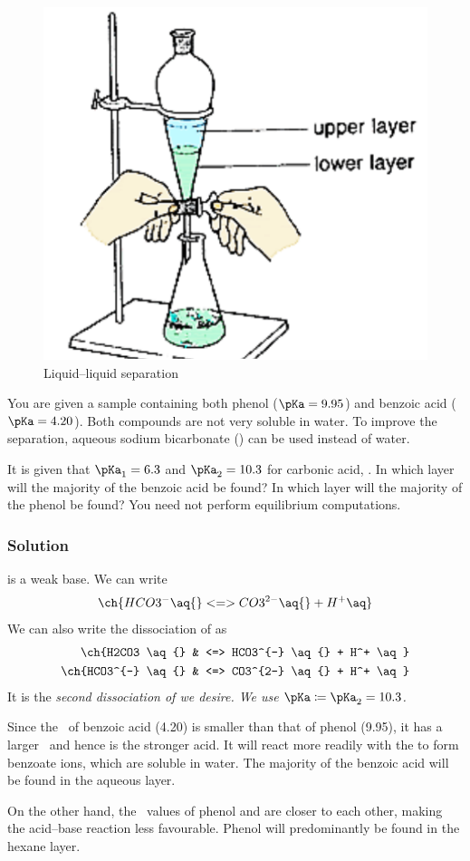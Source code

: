 \begin{figure}
	\centering
	\includegraphics[width=0.5\linewidth]{assets/08_ll_separation.png}
	\caption{Liquid--liquid separation}
	\label{fig:ll-sep}
\end{figure}

You are given a sample containing both phenol (\(\pKa = \num{9.95}\)) and benzoic
acid (\(\pKa = \num{4.20}\)). Both compounds are not very soluble in water. To
improve the separation, aqueous sodium bicarbonate () can be used instead
of water.

It is given that \(\pKa_1 = \num{6.3}\) and \(\pKa_2 = \num{10.3}\) for carbonic
acid, . In which layer will the majority of the benzoic acid be found?
In which layer will the majority of the phenol be found? You need not perform
equilibrium computations.

\subsubsection{Solution}
 is a weak base. We can write
\begin{equation*}
	\ch{HCO3^- \aq{} <=> CO3^{2-} \aq{} + H^+ \aq}
\end{equation*}
We can also write the dissociation of  as
\begin{align*}
	\ch{H2CO3 \aq{}    & <=> HCO3^{-} \aq{} + H^+ \aq} \\
	\ch{HCO3^{-} \aq{} & <=> CO3^{2-} \aq{} + H^+ \aq}
\end{align*}
It is the \it{second} dissociation of  we desire. We use
\(\pKa \coloneqq \pKa_2 = \num{10.3}\).

Since the \pKa\ of benzoic acid (\num{4.20}) is smaller than that of phenol
(\num{9.95}), it has a larger \Ka\ and hence is the stronger acid. It will react
more readily with the  to form benzoate ions, which are soluble
in water. {\color{accent} The majority of the benzoic acid will be found in the
		aqueous layer.}

On the other hand, the \pKa\ values of phenol and  are closer
to each other, making the acid--base reaction less favourable. {\color{accent}
		Phenol will predominantly be found in the hexane layer.}

